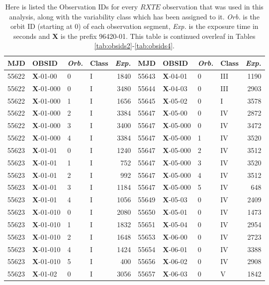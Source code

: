 \begin{table*}
\caption[The variability class assigned to each \textit{RXTE}/PCA observation of IGR J17091-3624 considered in this thesis.]{Here is listed the Observation IDs for every $RXTE$ observation that was used in this analysis, along with the variability class which has been assigned to it.  \textit{Orb.} is the orbit ID (starting at 0) of each observation segment, \textit{Exp.} is the exposure time in seconds and \textbf{X} is the prefix 96420-01.  This table is continued overleaf in Tables \ref{tab:obsids2}-\ref{tab:obsids4}.}
\label{tab:obsids}
\begin{tabular}{llllrllllr}
\hline
\hline
MJD&OBSID&\textit{Orb.}&Class&\textit{Exp.}&MJD&OBSID&\textit{Orb.}&Class&\textit{Exp.}\\
\hline
55622&\textbf{X}-01-00&0&I&1840&55643&\textbf{X}-04-01&0&III&1190\\
55622&\textbf{X}-01-000&0&I&3480&55644&\textbf{X}-04-03&0&III&2903\\
55622&\textbf{X}-01-000&1&I&1656&55645&\textbf{X}-05-02&0&I&3578\\
55622&\textbf{X}-01-000&2&I&3384&55647&\textbf{X}-05-00&0&IV&2872\\
55622&\textbf{X}-01-000&3&I&3400&55647&\textbf{X}-05-000&0&IV&3472\\
55622&\textbf{X}-01-000&4&I&3384&55647&\textbf{X}-05-000&1&IV&3520\\
55623&\textbf{X}-01-01&0&I&1240&55647&\textbf{X}-05-000&2&IV&3512\\
55623&\textbf{X}-01-01&1&I&752&55647&\textbf{X}-05-000&3&IV&3520\\
55623&\textbf{X}-01-01&2&I&992&55647&\textbf{X}-05-000&4&IV&3512\\
55623&\textbf{X}-01-01&3&I&1184&55647&\textbf{X}-05-000&5&IV&648\\
55623&\textbf{X}-01-01&4&I&1056&55649&\textbf{X}-05-03&0&IV&2409\\
55623&\textbf{X}-01-010&0&I&2080&55650&\textbf{X}-05-01&0&IV&1473\\
55623&\textbf{X}-01-010&1&I&1832&55651&\textbf{X}-05-04&0&IV&2954\\
55623&\textbf{X}-01-010&2&I&1648&55653&\textbf{X}-06-00&0&IV&2723\\
55623&\textbf{X}-01-010&4&I&1424&55654&\textbf{X}-06-01&0&IV&3388\\
55623&\textbf{X}-01-010&5&I&400&55656&\textbf{X}-06-02&0&IV&2908\\
55623&\textbf{X}-01-02&0&I&3056&55657&\textbf{X}-06-03&0&V&1842\\

\end{tabular}
\end{table*}

